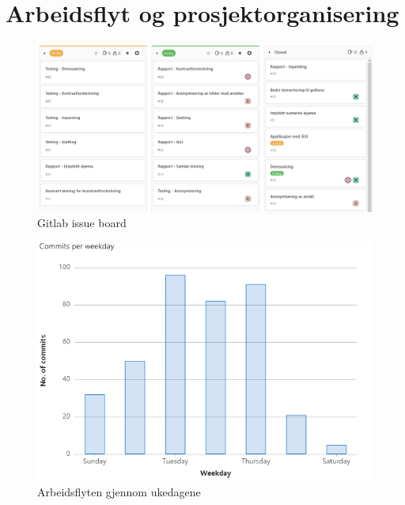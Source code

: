 \addappendix
\section{Arbeidsflyt og prosjektorganisering}
\label{sec:Arbeidsflyt}

\begin{figure}
\begin{center}
    \includegraphics[width=1\columnwidth]{bilder/issueboard.png}
    \caption{Gitlab issue board \label{Fig:issueboard}}
\end{center}
\end{figure}

\begin{figure}
\begin{center}
    \includegraphics[width=0.6\columnwidth]{bilder/commitsperweekday.png}
    \caption{Arbeidsflyten gjennom ukedagene \label{Fig:commitsperweekday}}
\end{center}
\end{figure}